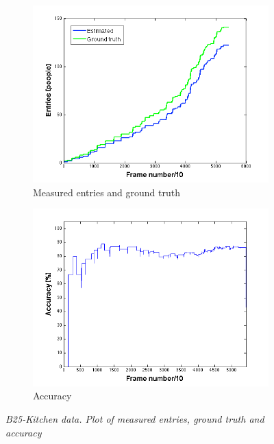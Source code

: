 \begin{figure}[H]
\centering
\begin{subfigure}{.5\textwidth}
  \centering
  \includegraphics[width=1.1\linewidth]{images/EntriesEval.png}
  \caption{Measured entries and ground truth}
  \label{fig:sub1}
\end{subfigure}%
\begin{subfigure}{.5\textwidth}
  \centering
  \includegraphics[width=1.1\linewidth]{images/AccEntriesEval.png}
  \caption{Accuracy}
  \label{fig:sub2}
\end{subfigure}
\caption[B25-kitchen entries]{\textit{B25-Kitchen data. Plot of measured entries, ground truth and accuracy}}
\label{fig:B25-kitchen entries}
\end{figure}

